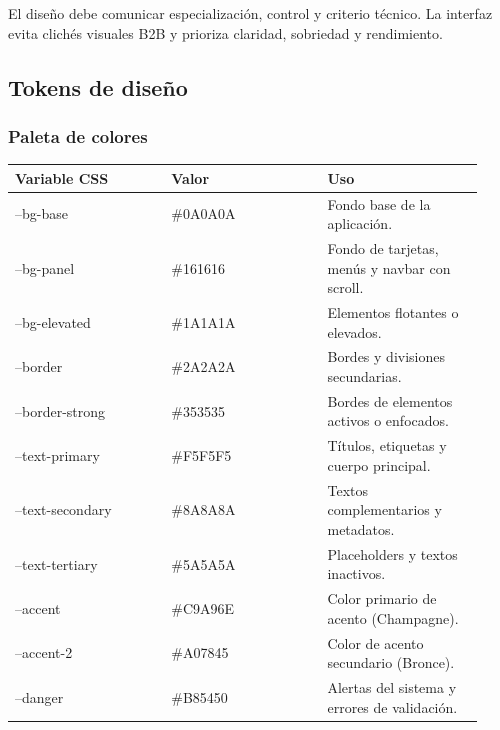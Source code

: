 \documentclass[11pt,letterpaper]{article}
\begin{document}
El diseño debe comunicar especialización, control y criterio técnico. La interfaz evita clichés visuales B2B y prioriza claridad, sobriedad y rendimiento.

\subsection{Tokens de diseño}

\subsubsection{Paleta de colores}

\begin{longtable}{p{0.31\linewidth}p{0.31\linewidth}p{0.31\linewidth}}
\toprule
\textbf{Variable CSS} & \textbf{Valor} & \textbf{Uso} \\
\midrule
--bg-base & \#0A0A0A & Fondo base de la aplicación. \\
--bg-panel & \#161616 & Fondo de tarjetas, menús y navbar con scroll. \\
--bg-elevated & \#1A1A1A & Elementos flotantes o elevados. \\
--border & \#2A2A2A & Bordes y divisiones secundarias. \\
--border-strong & \#353535 & Bordes de elementos activos o enfocados. \\
--text-primary & \#F5F5F5 & Títulos, etiquetas y cuerpo principal. \\
--text-secondary & \#8A8A8A & Textos complementarios y metadatos. \\
--text-tertiary & \#5A5A5A & Placeholders y textos inactivos. \\
--accent & \#C9A96E & Color primario de acento (Champagne). \\
--accent-2 & \#A07845 & Color de acento secundario (Bronce). \\
--danger & \#B85450 & Alertas del sistema y errores de validación. \\
\bottomrule
\end{longtable}
\end{document}
